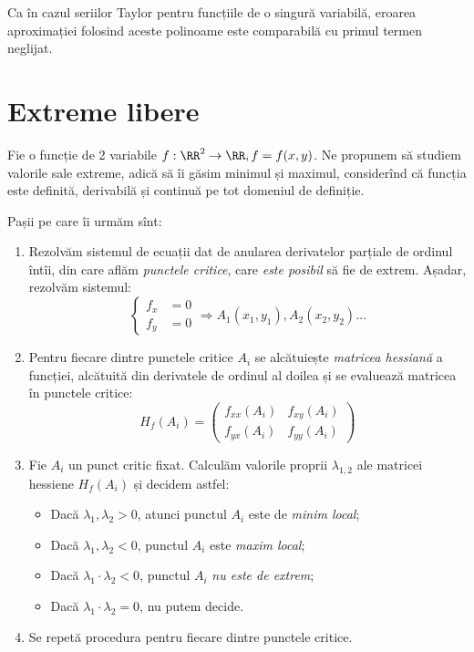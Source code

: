 Ca în cazul seriilor Taylor pentru funcțiile de o singură variabilă,
eroarea aproximației folosind aceste polinoame este comparabilă cu primul termen neglijat.


\section{Extreme libere}

Fie o funcție de 2 variabile $ f : \RR^2 \to \RR, f = f(x, y) $. Ne propunem
să studiem valorile sale extreme, adică să îi găsim minimul și maximul,
considerînd că funcția este definită, derivabilă și continuă pe tot domeniul
de definiție.

Pașii pe care îi urmăm sînt:
\begin{enumerate}[(1)]
\item Rezolvăm sistemul de ecuații dat de anularea derivatelor parțiale
  de ordinul întîi, din care aflăm \emph{punctele critice}, care \emph{este posibil}
  să fie de extrem. Așadar, rezolvăm sistemul:
  \[
    \begin{cases}
      f_x &= 0 \\
      f_y &= 0
    \end{cases} \Longrightarrow A_1(x_1, y_1), A_2(x_2, y_2)\dots
  \]
\item Pentru fiecare dintre punctele critice $ A_i $ se alcătuiește
  \emph{matricea hessiană} a funcției, alcătuită din derivatele de ordinul al
  doilea și se evaluează matricea în punctele critice:
  \[
    H_f(A_i) = \begin{pmatrix}
      f_{xx}(A_i) & f_{xy}(A_i) \\
      f_{yx}(A_i) & f_{yy}(A_i)
    \end{pmatrix}
  \]
\item Fie $ A_i $ un punct critic fixat. Calculăm valorile proprii $ \lambda_{1,2} $ ale
  matricei hessiene $ H_f(A_i) $ și decidem astfel:
  \begin{itemize}
  \item Dacă $ \lambda_1, \lambda_2 > 0 $, atunci punctul $ A_i $ este de \emph{minim local};
  \item Dacă $ \lambda_1, \lambda_2 < 0 $, punctul $ A_i $ este \emph{maxim local};
  \item Dacă $ \lambda_1 \cdot \lambda_2 < 0 $, punctul $ A_i $ \emph{nu este de extrem};
  \item Dacă $ \lambda_1 \cdot \lambda_2 = 0 $, nu putem decide.
  \end{itemize}
\item Se repetă procedura pentru fiecare dintre punctele critice.
\end{enumerate}


